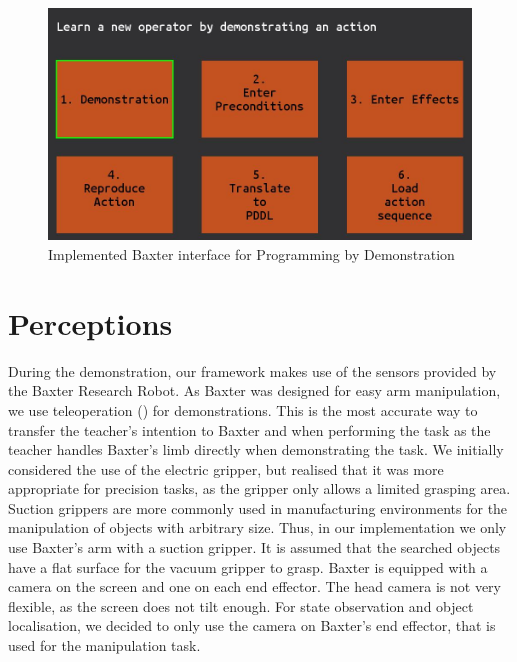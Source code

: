   \begin{figure}[h]
    \centering
    \includegraphics[scale=0.5]{figures/interface}
    \caption{Implemented Baxter interface for Programming by Demonstration}
    \label{fig:interface}
  \end{figure}



\section{Perceptions}
During the demonstration, our framework makes use of the sensors provided by the Baxter Research Robot. 
As Baxter was designed for easy arm manipulation, we use teleoperation () for demonstrations. This is the most accurate way to transfer the teacher's intention to Baxter and when performing the task as the teacher handles Baxter's limb directly when demonstrating the task.
We initially considered the use of the electric gripper, but realised that it was more appropriate for precision tasks, as the gripper only allows a limited grasping area. Suction grippers are more commonly used in manufacturing environments for the manipulation of objects with arbitrary size.
Thus, in our implementation we only use Baxter's arm with a suction gripper. It is assumed that the searched objects have a flat surface for the vacuum gripper to grasp. 
Baxter is equipped with a camera on the screen and one on each end effector. The head camera is not very flexible, as the screen does not tilt enough. For state observation and object localisation, we decided to only use the camera on Baxter's end effector, that is used for the manipulation task.
 
